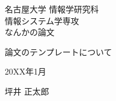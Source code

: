 \begin{titlepage}
    \begin{center}
        \Huge{
            名古屋大学 情報学研究科 \\
            情報システム学専攻 \\
            なんかの論文
        }

        \vspace{160truept}

        \Huge{
            論文のテンプレートについて
        }

        \vspace{160truept}

        \huge{20XX年1月}

        \vspace{10truept}

        \huge{坪井 正太郎}
    \end{center}
\end{titlepage}
